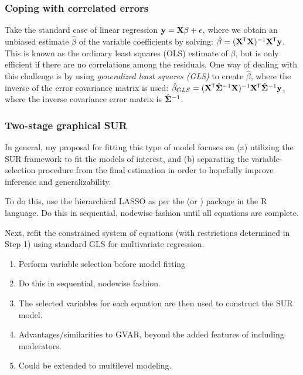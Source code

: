 \subsubsection{Coping with correlated errors}
Take the standard case of linear regression $\mathbf{y} = \mathbf{X}\beta + \epsilon$, where we obtain an unbiased estimate $\hat{\beta}$ of the variable coefficients by solving: $\hat{\beta} = (\mathbf{X}^{\mkern-1.5mu\mathsf{T}} \mathbf{X})^{-1} \mathbf{X}^{\mkern-1.5mu\mathsf{T}} \mathbf{y}$. This is known as the ordinary least squares (OLS) estimate of $\beta$, but is only efficient if there are no correlations among the residuals. One way of dealing with this challenge is by using \textit{generalized least squares (GLS)} to create $\hat{\beta}$, where the inverse of the error covariance matrix is used: $\hat{\beta}_{GLS} = (\mathbf{X}^{\mkern-1.5mu\mathsf{T}} \hat{\mathbf{\Sigma}}^{-1} \mathbf{X})^{-1} \mathbf{X}^{\mkern-1.5mu\mathsf{T}} \hat{\mathbf{\Sigma}}^{-1} \mathbf{y}$, where the inverse covariance error matrix is $\hat{\mathbf{\Sigma}}^{-1}$.

\subsubsection{Two-stage graphical SUR}
In general, my proposal for fitting this type of model focuses on (a) utilizing the SUR framework to fit the models of interest, and (b) separating the variable-selection procedure from the final estimation in order to hopefully improve inference and generalizability. 

To do this, use the hierarchical LASSO as per the  (or ) package in the R language. Do this in sequential, nodewise fashion until all equations are complete.

Next, refit the constrained system of equations (with restrictions determined in Step 1) using standard GLS for multivariate regression.

\begin{enumerate}
    \item Perform variable selection before model fitting
    \item Do this in sequential, nodewise fashion.
    \item The selected variables for each equation are then used to construct the SUR model. 
    \item Advantages/similarities to GVAR, beyond the added features of including moderators.
    \item Could be extended to multilevel modeling.
\end{enumerate}

